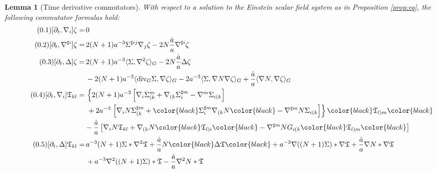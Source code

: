 \documentclass[11pt,leqno,textwidth=10cm]{amsart}
\numberwithin{equation}{section}
\theoremstyle{definition}
\theoremstyle{plain}
\newtheorem{lemma}[definition]{Lemma}
\newcommand{\1}{\mathbbm{1}}
\newcommand{\del}{\partial}
\newcommand{\Lap}{\Delta}
\renewcommand{\div}{\text{\normalfont{div}}}
\newcommand{\numberthis}{\addtocounter{equation}{1}\tag{\theequation}}
\renewcommand{\theequation}{\arabic{section}.\arabic{equation}}
\newcommand{\change}[1]{\color{black}#1\color{black}}
\begin{document}
\begin{lemma}[Time derivative commutators]\label{lem:com-time-first} With respect to a solution to the Einstein scalar field system as in Proposition \ref{prop:eq}, the following commutator formulas hold:
\begin{subequations}
\begin{align*}
\numberthis\label{eq:[del-t,nabla]zeta}[\del_t,\nabla_i]\zeta=&\,0\\
\numberthis\label{eq:[del-t,nabla-sharp]zeta}[\del_t,\nabla^{\sharp i}]\zeta=&\,2(N+1)a^{-3}\Sigma^{\sharp ij}\nabla_j\zeta-2N\frac{\dot{a}}a\nabla^{\sharp i}\zeta\\
\numberthis\label{eq:[del-t,Lap]zeta}[\del_t,\Lap]\zeta=&\,2(N+1)a^{-3}\langle\Sigma,\nabla^2\zeta\rangle_G-2N\frac{\dot{a}}a\Lap\zeta\\
&\,-2(N+1)a^{-3}\langle\div_G\Sigma,\nabla\zeta\rangle_G-2a^{-3}\langle\Sigma,\nabla N\nabla\zeta\rangle_G+\frac{\dot{a}}a\langle\nabla N,\nabla\zeta\rangle_G\\
\numberthis\label{eq:[del-t,nabla]T}[\del_t,\nabla_i]\mathfrak{T}_{kl}%
=&\,\left\{2(N+1)a^{-3}\left[\nabla_i\Sigma_{(k}^m+\nabla_{(k}\Sigma_i^{\sharp m}-\nabla^m\Sigma_{i(k}\right]\right.\\
&\ +2a^{-3}\left.\left[\nabla_i N\Sigma^{\sharp m}_{(k}+\change{\Sigma^{\sharp m}_i\nabla_{(k}N}-\nabla^{\sharp m}N\Sigma_{i(k}\right]\right\}\change{\mathfrak{T}_{l)m}}\\
&-\frac{\dot{a}}a\left[\nabla_iN\mathfrak{T}_{kl}+\nabla_{(k}N\change{\mathfrak{T}_{l)i}}-\nabla^{\sharp m}NG_{i(k}\change{\mathfrak{T}_{l)m}}\right]\\
\numberthis\label{eq:[del-t,Lap]T}[\del_t,\Lap]\mathfrak{T}_{kl}%
=&\,a^{-3}(N+1)\Sigma\ast\nabla^2\mathfrak{T}+\frac{\dot{a}}aN\change{\Lap\mathfrak{T}}+a^{-3}\nabla((N+1)\Sigma)\ast\nabla \mathfrak{T}+\frac{\dot{a}}a\nabla N\ast\nabla \mathfrak{T}\\
&\,+a^{-3}\nabla^2((N+1)\Sigma)\ast \mathfrak{T}-\frac{\dot{a}}a\nabla^2N\ast \mathfrak{T}
\end{align*}
\end{subequations}
\end{lemma}
\end{document}
